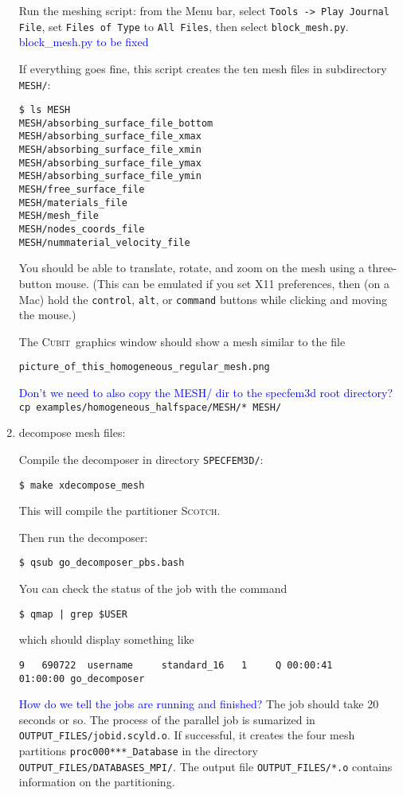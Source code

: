 \documentclass[10pt,fleqn,letterpaper]{article}
\newcommand{\cubit}{\textsc{Cubit}}
\newcommand{\blue}[1]{\textcolor{blue}{#1}}
\begin{document}
\begin{enumerate}
Run the meshing script: from the Menu bar, select \verb+Tools -> Play Journal File+, set \verb+Files of Type+ to \verb+All Files+, then select \verb+block_mesh.py+. 
\blue{block\_mesh.py to be fixed}

If everything goes fine, this script creates the ten mesh files in subdirectory \verb+MESH/+:
\begin{lstlisting}
$ ls MESH
MESH/absorbing_surface_file_bottom
MESH/absorbing_surface_file_xmax
MESH/absorbing_surface_file_xmin
MESH/absorbing_surface_file_ymax
MESH/absorbing_surface_file_ymin
MESH/free_surface_file
MESH/materials_file
MESH/mesh_file
MESH/nodes_coords_file
MESH/nummaterial_velocity_file
\end{lstlisting}

You should be able to translate, rotate, and zoom on the mesh using a three-button mouse. (This can be emulated if you set X11 preferences, then (on a Mac) hold the \verb+control+, \verb+alt+, or \verb+command+ buttons while clicking and moving the mouse.)

The \cubit\ graphics window should show a mesh similar to the file
\begin{verbatim}
picture_of_this_homogeneous_regular_mesh.png
\end{verbatim}
\blue{Don't we need to also copy the MESH/ dir to the specfem3d root directory?}\verb+cp examples/homogeneous_halfspace/MESH/* MESH/+

\item decompose mesh files:

Compile the decomposer in directory \verb+SPECFEM3D/+:
\begin{lstlisting}
$ make xdecompose_mesh
\end{lstlisting}
%
This will compile the partitioner \textsc{Scotch}.

Then run the decomposer:
\begin{lstlisting}
$ qsub go_decomposer_pbs.bash
\end{lstlisting}
%
You can check the status of the job with the command
%
\begin{lstlisting}
$ qmap | grep $USER
\end{lstlisting}
%
which should display something like 
\begin{lstlisting}
9   690722  username     standard_16   1     Q 00:00:41     01:00:00 go_decomposer
\end{lstlisting}
\blue{How do we tell the jobs are running and finished?} The job should take 20 seconds or so. The process of the parallel job is sumarized in \verb+OUTPUT_FILES/jobid.scyld.o+. If successful, it creates the four mesh partitions \verb+proc000***_Database+ in the directory \verb+OUTPUT_FILES/DATABASES_MPI/+. The output file \verb+OUTPUT_FILES/*.o+ contains information on the partitioning.


\end{enumerate}
\end{document}
